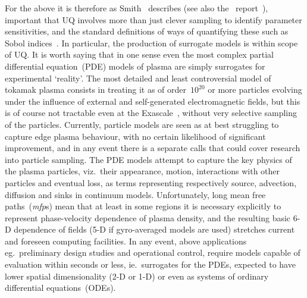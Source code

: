 For the above it is therefore as Smith~\cite{smithUQ} describes (see also the \nep \
report~\cite[\S\,1]{y2re313}), important that UQ involves more than just clever sampling
to identify parameter sensitivities, and the standard definitions of ways of quantifying
these such as Sobol indices~\cite{y2re241}. In particular,
the production of surrogate models is within scope of UQ.
It is worth saying that in one sense even the most complex partial differential equation~(PDE) models of plasma are 
simply surrogates for experimental `reality'. The most detailed and least controversial
model of tokamak plasma consists in treating it as of order~$10^{20}$ or more particles evolving
under the influence of external and self-generated electromagnetic fields, but
this is of course not tractable even at the Exascale~\cite{Wa95a}, without very selective
sampling of the particles. Currently, particle models are seen as at best struggling to capture
edge plasma behaviour, with no certain likelihood of significant improvement, and 
in any event there is a separate calls that could cover research into particle sampling. The PDE models
attempt to capture the key physics of the plasma particles, viz.\ their appearance, motion,
interactions with other particles and eventual loss, as terms representing respectively
source, advection, diffusion and sinks in continuum models. Unfortunately, long mean free
paths~(\emph{mfp}s) mean that at least in some regions it is necessary explicitly to represent
phase-velocity dependence of plasma density, and the resulting basic 6-D dependence of 
fields (5-D if gyro-averaged models are used) stretches current and foreseen computing
facilities. In any event, above applications eg.\ preliminary design studies and operational control,
require models capable of evaluation within seconds or less, ie.\  surrogates for the
PDEs, expected to have lower spatial dimensionality (2-D or 1-D) or even as systems of 
ordinary differential equations~(ODEs).

